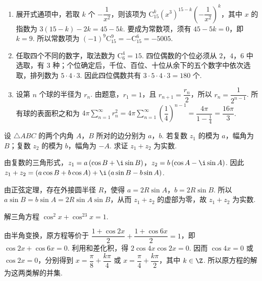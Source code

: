 \documentclass[UTF8,a4paper,oneside,11pt]{ctexbook}
\begin{document}
\begin{solution}
\begin{enumerate}
\item 展开式通项中，若取 \(k\) 个 \(-\dfrac{1}{x^2}\)，则该项为 \(\mathrm C_{15}^{k}\left(x^3\right)^{15-k}\left(-\dfrac{1}{x^2}\right)^k\)，其中 \(x\) 的指数为 \(3(15-k)-2k=45-5k\). 要成为常数项，须有 \(45-5k=0\)，即 \(k=9\). 所以常数项为 \((-1)^9\mathrm C_{15}^{9}=-\mathrm C_{15}^{6}=-5005\).
\item 任取四个不同的数字，取法数为 \(\mathrm C_6^4=15\). 四位偶数的个位必须从 \(2\)，\(4\)，\(6\) 中选取，有 \(3\) 种；个位确定后，千位、百位、十位从余下的五个数字中依次选取，排列数为 \(5\cdot4\cdot3\). 因此四位偶数共有 \(3\cdot5\cdot4\cdot3=180\) 个.
\item 设第 \(n\) 个球的半径为 \(r_n\). 由题意，\(r_1=1\)，且 \(r_{n+1}=\dfrac{r_n}{2}\)，所以 \(r_n=\dfrac{1}{2^{n-1}}\). 所有球的表面积之和为 \(4\pi\sum_{n=1}^{\infty}r_n^2=4\pi\sum_{n=1}^{\infty}\left(\dfrac14\right)^{n-1}=\dfrac{4\pi}{1-\frac14}=\dfrac{16\pi}{3}\).
\end{enumerate}
\end{solution}

\begin{problem}

设 \(\triangle ABC\) 的两个内角 \(A\)，\(B\) 所对的边分别为 \(a\)，\(b\). 若复数 \(z_1\) 的模为 \(a\)，幅角为 \(B\)；复数 \(z_2\) 的模为 \(b\)，幅角为 \(-A\). 求证 \(z_1+z_2\) 为实数.
\end{problem}

\begin{solution}
由复数的三角形式，\(z_1=a\left(\cos B+\i\sin B\right)\)，\(z_2=b\left(\cos A-\i\sin A\right)\). 因此
\(z_1+z_2=\left(a\cos B+b\cos A\right)+\i\left(a\sin B-b\sin A\right)\).

由正弦定理，存在外接圆半径 \(R\)，使得 \(a=2R\sin A\)，\(b=2R\sin B\). 所以 \(a\sin B=b\sin A=2R\sin A\sin B\)，从而 \(z_1+z_2\) 的虚部为零，故 \(z_1+z_2\) 为实数.
\end{solution}

\begin{problem}

解三角方程 \(\cos^2x+\cos^23x=1\).
\end{problem}

\begin{solution}
由半角变换，原方程等价于 \(\dfrac{1+\cos2x}{2}+\dfrac{1+\cos6x}{2}=1\)，即 \(\cos2x+\cos6x=0\). 利用和差化积，得 \(2\cos4x\cos2x=0\). 因而
\(\cos4x=0\) 或 \(\cos2x=0\)，分别得到 \(x=\dfrac{\pi}{8}+\dfrac{k\pi}{4}\) 或 \(x=\dfrac{\pi}{4}+\dfrac{k\pi}{2}\)，其中 \(k\in\Z\). 所以原方程的解为这两类解的并集.
\end{solution}
\end{document}
